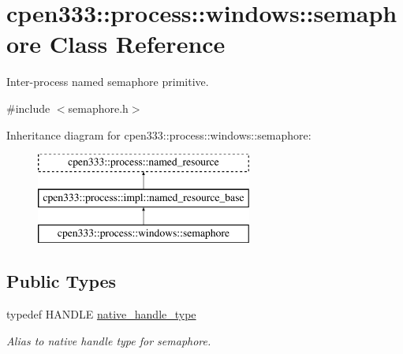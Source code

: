\hypertarget{classcpen333_1_1process_1_1windows_1_1semaphore}{}\section{cpen333\+:\+:process\+:\+:windows\+:\+:semaphore Class Reference}
\label{classcpen333_1_1process_1_1windows_1_1semaphore}


Inter-\/process named semaphore primitive.  




{\ttfamily \#include $<$semaphore.\+h$>$}

Inheritance diagram for cpen333\+:\+:process\+:\+:windows\+:\+:semaphore\+:\begin{figure}[H]
\begin{center}
\leavevmode
\includegraphics[height=3.000000cm]{classcpen333_1_1process_1_1windows_1_1semaphore}
\end{center}
\end{figure}
\subsection*{Public Types}
\begin{DoxyCompactItemize}
\item 
typedef H\+A\+N\+D\+LE \hyperlink{classcpen333_1_1process_1_1windows_1_1semaphore_a07f523e9a1edf0ae8afa2f21487a1953}{native\+\_\+handle\+\_\+type}
\begin{DoxyCompactList}\small\item\em Alias to native handle type for semaphore. \end{DoxyCompactList}\end{DoxyCompactItemize}
